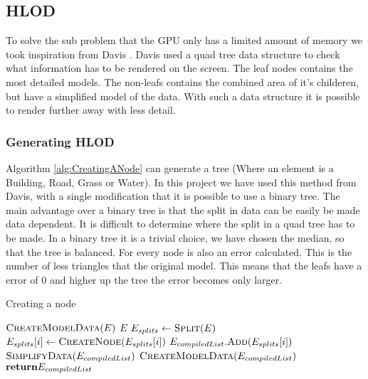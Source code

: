 \subsection{HLOD}
\label{subsec:HLOD}
To solve the sub problem that the GPU only has a limited amount of memory we took inspiration from Davis \cite{Davis}. Davis used a quad tree data structure to check what information has to be rendered on the screen. The leaf nodes contains the most detailed models. The non-leafs contains the combined area of it's childeren, but have a simplified model of the data. With such a data structure it is possible to render further away with less detail.

\subsubsection{Generating HLOD}
Algorithm \ref{alg:CreatingANode} can generate a tree (Where an element is a Building, Road, Grass or Water). In this project we have used this method from Davis, with a single modification that it is possible to use a binary tree. The main advantage over a binary tree is that the split in data can be easily be made data dependent. It is difficult to determine where the split in a quad tree has to be made. In a binary tree it is a trivial choice, we have chosen the median, so that the tree is balanced. For every node is also an error calculated. This is the number of less triangles that the original model. This means that the leafs have a error of 0 and higher up the tree the error becomes only larger.

\begin{algorithm}[h]
\caption{Creating a node}\label{alg:CreatingANode}
\begin{algorithmic}[1]
    \State $\Call{CreateModelData}{E}$
    \State \Return $E$
\Else
    \State $E_{splits}\gets \Call{Split}{E}$ 
        \State $E_{splits}[i] \gets \Call{CreateNode}{E_{splits}[i]}$
        \State $E_{compiledList}.\Call{Add}{E_{splits}[i]}$
    \EndFor
    \State $\Call{SimplifyData}{E_{compiledList}}$
    \State $\Call{CreateModelData}{E_{compiledList}}$
    \State $\Return E_{compiledList}$
\EndIf
\EndProcedure
\end{algorithmic}
\end{algorithm}

